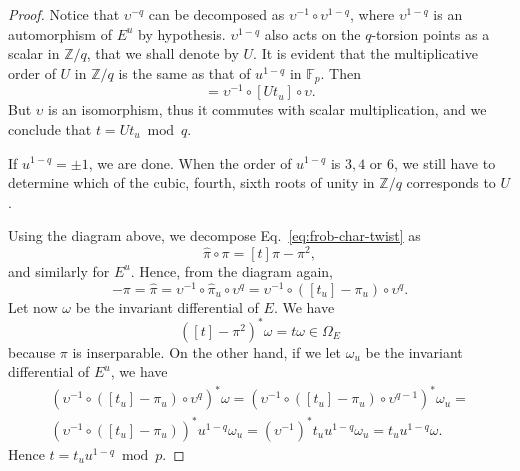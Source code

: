 \documentclass[12pt]{article}
\theoremstyle{plain}
\theoremstyle{definition}
\def\Z{\ensuremath{\mathbb{Z}}}
\def\F{\ensuremath{\mathbb{F}}}
\begin{document}
\begin{proof}
  Notice that $\upsilon^{-q}$ can be decomposed as
  $\upsilon^{-1}\circ\upsilon^{1-q}$, where $\upsilon^{1-q}$ is an
  automorphism of $E^u$ by hypothesis. $\upsilon^{1-q}$ also acts on
  the $q$-torsion points as a scalar in $\Z/q$, that we shall denote
  by $U$. It is evident that the multiplicative order of $U$ in $\Z/q$
  is the same as that of $u^{1-q}$ in $\F_p$. Then
  \begin{equation*}
    [t] = \upsilon^{-1}\circ[Ut_u]\circ\upsilon.
  \end{equation*}
  But $\upsilon$ is an isomorphism, thus it commutes with scalar
  multiplication, and we conclude that $t=Ut_u\bmod q$.

  If $u^{1-q}=\pm1$, we are done. When the order of $u^{1-q}$ is $3,4$
  or $6$, we still have to determine which of the cubic, fourth, sixth
  roots of unity in $\Z/q$ corresponds to $U$.

  Using the diagram above, we decompose
  Eq.~\eqref{eq:frob-char-twist} as
  \begin{equation*}
    \hat\pi\circ\pi = [t]\pi - \pi^2,
  \end{equation*}
  and similarly for $E^u$. Hence, from the diagram again,
  \begin{equation*}
    [t] - \pi = \hat\pi = \upsilon^{-1}\circ\hat\pi_u\circ\upsilon^q 
    =  \upsilon^{-1}\circ([t_u] - \pi_u)\circ\upsilon^q.
  \end{equation*}
  Let now $\omega$ be the invariant differential of $E$. We have
  \begin{equation*}
    ([t]-\pi^2)^\ast\omega = t\omega\in\Omega_E
  \end{equation*}
  because $\pi$ is inserparable. On the other hand, if we let
  $\omega_u$ be the invariant differential of $E^u$, we have
  \begin{multline*}
    (\upsilon^{-1}\circ([t_u] - \pi_u)\circ\upsilon^q)^\ast\omega =
    (\upsilon^{-1}\circ([t_u] - \pi_u)\circ\upsilon^{q-1})^\ast\omega_u =\\
    (\upsilon^{-1}\circ([t_u] - \pi_u))^\ast u^{1-q}\omega_u =
    (\upsilon^{-1})^\ast t_uu^{1-q}\omega_u =
    t_uu^{1-q}\omega.
  \end{multline*}
  Hence $t = t_uu^{1-q} \bmod p$.
\end{proof}




\end{document}

